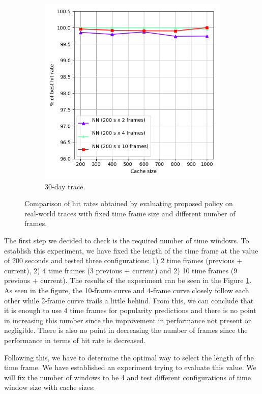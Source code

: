 \begin{figure}[t!]
\begin{subfigure}[b]{0.49\linewidth}
		\includegraphics[width=\linewidth]{pics/cache5_2.png}
		\caption{30-day trace.}
	\end{subfigure}
	\caption{Comparison of hit rates obtained by evaluating proposed policy on real-world traces with fixed time frame size and different number of frames.}
	\label{fig:cache5}
\end{figure}

The first step we decided to check is the required number of time windows. To establish this experiment, we have fixed the length of the time frame at the value of 200 seconds and tested three configurations: 1) 2 time frames (previous + current), 2) 4 time frames (3 previous + current) and 2) 10 time frames (9 previous + current). The results of the experiment can be seen in the Figure \ref{fig:cache5}. As seen in the figure, the 10-frame curve and 4-frame curve closely follow each other while 2-frame curve trails a little behind. From this, we can conclude that it is enough to use 4 time frames for popularity predictions and there is no point in increasing this number since the improvement in performance not present or negligible. There is also no point in decreasing the number of frames since the performance in terms of hit rate is decreased.

Following this, we have to determine the optimal way to select the length of the time frame. We have established an experiment trying to evaluate this value. We will fix the number of windows to be 4 and test different configurations of time window size with cache sizes:

